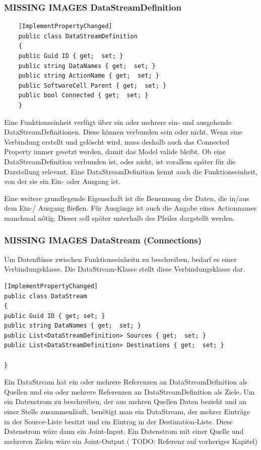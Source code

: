 	\subsubsection{MISSING IMAGES DataStreamDefinition}
	
	\begin{verbatim}
	[ImplementPropertyChanged]
	public class DataStreamDefinition
	{
	public Guid ID { get;  set; }
	public string DataNames { get;  set; }
	public string ActionName { get;  set; }
	public SoftwareCell Parent { get;  set; }
	public bool Connected { get;  set; }
	}
	\end{verbatim}
	
	Eine Funktionseinheit verfügt über ein oder mehrere ein- und ausgehende
	DataStreamDefinitionen. Diese können verbunden sein oder nicht. Wenn eine
	Verbindung erstellt und gelöscht wird, muss deshalb auch das Connected
	Property immer gesetzt werden, damit das Model valide bleibt.
	Ob eine DataStreamDefinition verbunden ist, oder nicht, ist vorallem später
	für die Darstellung relevant.
	Eine DataStreamDefinition kennt auch die Funktionseinheit, von der sie ein
	Ein- oder Ausgang ist.
	
	Eine weitere grundlegende Eigenschaft ist die Benennung der Daten, die in/aus
	dem Ein-/ Ausgang fließen. Für Ausgänge ist auch die Angabe eines
	Actionnames manchmal nötig. Dieser soll später unterhalb des Pfeiles
	dargstellt werden.


\subsubsection{{\bfseries\sffamily MISSING IMAGES} DataStream (Connections)}

Um Datenflüsse zwischen Funktionseinheitn zu beschreiben, bedarf es einer
Verbindungsklasse. Die DataStream-Klasse stellt diese Verbindungsklasse dar.


\begin{verbatim}
[ImplementPropertyChanged]
public class DataStream
{
public Guid ID { get; set; }
public string DataNames { get;  set; }
public List<DataStreamDefinition> Sources { get;  set; }
public List<DataStreamDefinition> Destinations { get;  set; }

}
\end{verbatim}

Ein DataStream hat ein oder mehrere Referenzen an DataStreamDefinition als
Quellen und ein oder mehrere Referenzen an DataStreamDefinition als Ziele.
Um ein Datenstrom zu beschreiben, der aus mehren Quellen Daten bezieht und
an einer Stelle zusammenläuft, benötigt man ein DataStream, der mehrer
Einträge in der Source-Liste besitzt und ein Eintrag in der
Destination-Liste. Diese Datenstrom wäre dann ein Joint-Input.
Ein Datenstrom mit einer Quelle und mehreren Zielen wäre ein Joint-Output ( TODO:
Referenz auf vorheriges Kapitel)

